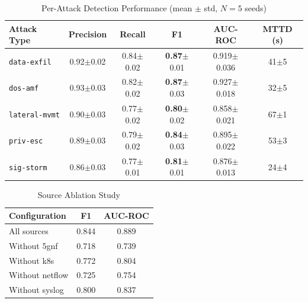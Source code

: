 \begin{table}[t]
\centering
\caption{Per-Attack Detection Performance (mean $\pm$ std, $N=5$ seeds)}
\label{tab:per_attack}
\begin{tabular}{lccccc}
\toprule
Attack Type & Precision & Recall & F1 & AUC-ROC & MTTD (s) \\
\midrule
\texttt{data-exfil} & 0.92$\pm$0.02 & 0.84$\pm$0.02 & \textbf{0.87}$\pm$0.01 & 0.919$\pm$0.036 & 41$\pm$5 \\
\texttt{dos-amf} & 0.93$\pm$0.03 & 0.82$\pm$0.02 & \textbf{0.87}$\pm$0.03 & 0.927$\pm$0.018 & 32$\pm$5 \\
\texttt{lateral-mvmt} & 0.90$\pm$0.03 & 0.77$\pm$0.02 & \textbf{0.80}$\pm$0.02 & 0.858$\pm$0.021 & 67$\pm$1 \\
\texttt{priv-esc} & 0.89$\pm$0.03 & 0.79$\pm$0.02 & \textbf{0.84}$\pm$0.03 & 0.895$\pm$0.022 & 53$\pm$3 \\
\texttt{sig-storm} & 0.86$\pm$0.03 & 0.77$\pm$0.01 & \textbf{0.81}$\pm$0.01 & 0.876$\pm$0.013 & 24$\pm$4 \\
\bottomrule
\end{tabular}
\end{table}

\begin{table}[t]
\centering
\caption{Source Ablation Study}
\label{tab:ablation}
\begin{tabular}{lcc}
\toprule
Configuration & F1 & AUC-ROC \\
\midrule
All sources & 0.844 & 0.889 \\
Without 5gnf & 0.718 & 0.739 \\
Without k8s & 0.772 & 0.804 \\
Without netflow & 0.725 & 0.754 \\
Without syslog & 0.800 & 0.837 \\
\bottomrule
\end{tabular}
\end{table}

